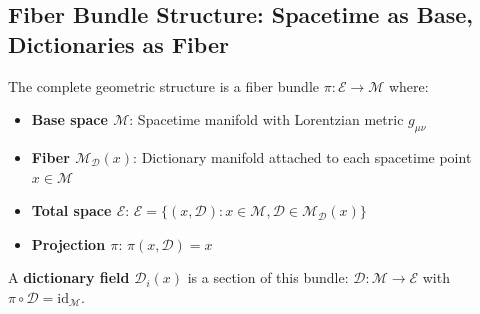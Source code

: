 \documentclass[11pt,a4paper]{article}
\begin{document}
	\subsection{Fiber Bundle Structure: Spacetime as Base, Dictionaries as Fiber}
	The complete geometric structure is a fiber bundle $\pi: \mathcal{E} \to \mathcal{M}$ where:
	\begin{itemize}
		\item \textbf{Base space $\mathcal{M}$}: Spacetime manifold with Lorentzian metric $g_{\mu\nu}$
		\item \textbf{Fiber $\mathcal{M}_{\mathcal{D}}(x)$}: Dictionary manifold attached to each spacetime point $x \in \mathcal{M}$
		\item \textbf{Total space $\mathcal{E}$}: $\mathcal{E} = \{(x, \mathcal{D}) : x \in \mathcal{M}, \mathcal{D} \in \mathcal{M}_{\mathcal{D}}(x)\}$
		\item \textbf{Projection $\pi$}: $\pi(x, \mathcal{D}) = x$
	\end{itemize}
	
	A \textbf{dictionary field} $\mathcal{D}_i(x)$ is a section of this bundle: $\mathcal{D}: \mathcal{M} \to \mathcal{E}$ with $\pi \circ \mathcal{D} = \text{id}_{\mathcal{M}}$.
	
\end{document}
